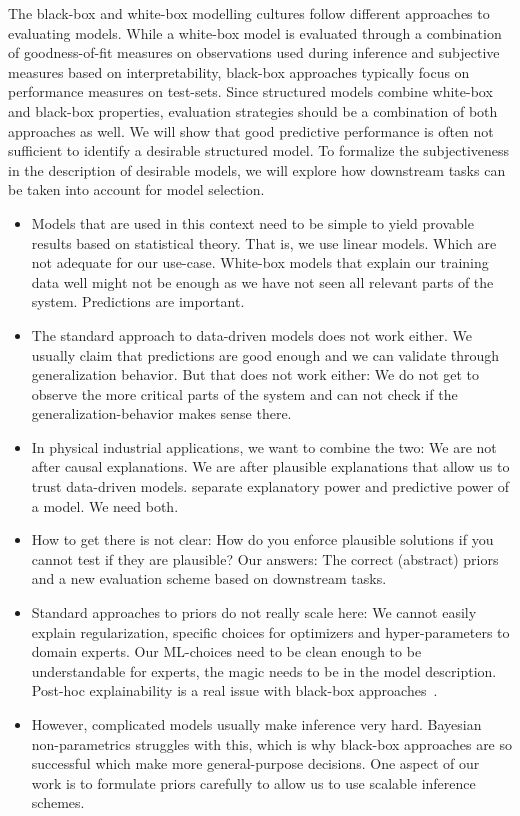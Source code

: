 The black-box and white-box modelling cultures follow different approaches to evaluating models.
While a white-box model is evaluated through a combination of goodness-of-fit measures on observations used during inference and subjective measures based on interpretability, black-box approaches typically focus on performance measures on test-sets.
Since structured models combine white-box and black-box properties, evaluation strategies should be a combination of both approaches as well.
We will show that good predictive performance is often not sufficient to identify a desirable structured model.
To formalize the subjectiveness in the description of desirable models, we will explore how downstream tasks can be taken into account for model selection.

\begin{itemize}
    \item Models that are used in this context need to be simple to yield provable results based on statistical theory. That is, we use linear models. Which are not adequate for our use-case. White-box models that explain our training data well might not be enough as we have not seen all relevant parts of the system. Predictions are important.
    \item The standard approach to data-driven models does not work either. We usually claim that predictions are good enough and we can validate through generalization behavior. But that does not work either: We do not get to observe the more critical parts of the system and can not check if the generalization-behavior makes sense there.
    \item In physical industrial applications, we want to combine the two: We are not after causal explanations. We are after plausible explanations that allow us to trust data-driven models. \Textcite{shmueli_explain_2010} separate explanatory power and predictive power of a model. We need both.
    \item How to get there is not clear: How do you enforce plausible solutions if you cannot test if they are plausible? Our answers: The correct (abstract) priors and a new evaluation scheme based on downstream tasks.
    \item Standard approaches to priors do not really scale here: We cannot easily explain regularization, specific choices for optimizers and hyper-parameters to domain experts. Our ML-choices need to be clean enough to be understandable for experts, the magic needs to be in the model description. Post-hoc explainability is a real issue with black-box approaches~\parencite{rudin_stop_2019}.
    \item However, complicated models usually make inference very hard. Bayesian non-parametrics struggles with this, which is why black-box approaches are so successful which make more general-purpose decisions. One aspect of our work is to formulate priors carefully to allow us to use scalable inference schemes.
\end{itemize}


